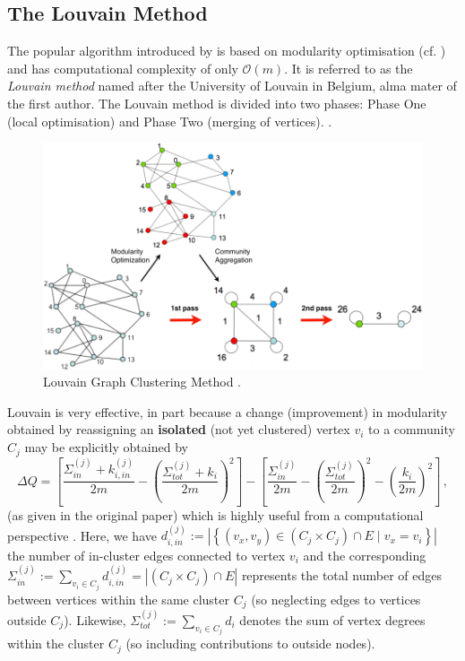 \documentclass[12pt, a4paper]{article}
\begin{document}
  \subsection{The Louvain Method}
  The popular algorithm introduced by \cite{lambiotte-louvain-clustering} is based on modularity optimisation (cf. ) and has computational complexity of only $\mathcal{O}(m)$.
  It is referred to as the \textit{Louvain method} named after the University of Louvain in Belgium, alma mater of the first author.
  The Louvain method is divided into two phases: Phase One (local optimisation) and Phase Two (merging of vertices).
  \cite{grindrod-lecture-notes}.

  \begin{figure}[H]
    \centering
    \includegraphics[width=\linewidth]{figures/blondel.png}
    \caption{Louvain Graph Clustering Method \cite{lambiotte-louvain-clustering}.}
  \end{figure}

  Louvain is very effective, in part because a change (improvement) in modularity obtained by reassigning an \textbf{isolated} (not yet clustered) vertex $v_i$ to a community $C_j$ may be explicitly obtained by
  \begin{equation}
    \Delta Q=\left[ \frac{\Sigma_{in}^{(j)} + k_{i,in}^{(j)}}{2 m} - \left(\frac{\Sigma_{tot}^{(j)} + k_{i}}{2m}\right)^2 \right] - \left[ \frac{\Sigma_{in}^{(j)}}{2m} - \left(\frac{\Sigma_{tot}^{(j)}}{2m}\right)^2 - \left(\frac{k_i}{2m}\right)^2 \right] \,,
    \label{eq:blondel-deltaQ}
  \end{equation}
  (as given in the original paper) which is highly useful from a computational perspective \parencite{lambiotte-louvain-clustering}.
  Here, we have $d_{i,in}^{(j)} := \left|\left\{(v_x, v_y) \in (C_j \times C_j) \cap E \;\big|\; v_x = v_i\right\}\right|$ the number of in-cluster edges connected to vertex $v_i$ and the corresponding $\Sigma_{in}^{(j)} := \sum_{v_i \in C_j} d_{i,in}^{(j)} = \left|(C_j \times C_j) \cap E\right|$ represents the total number of edges between vertices within the same cluster $C_j$ (so neglecting edges to vertices outside $C_j$).
  Likewise, $\Sigma_{tot}^{(j)} := \sum_{v_i \in C_j} d_i$ denotes the sum of vertex degrees within the cluster $C_j$ (so including contributions to outside nodes).
\end{document}
